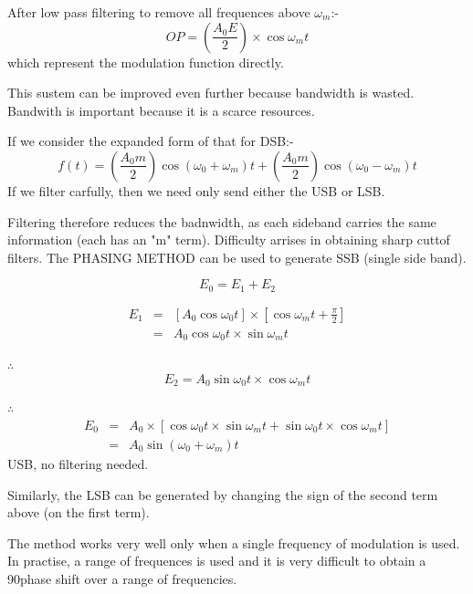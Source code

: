 \documentclass[11pt]{article} %
\begin{document}
After low pass filtering to remove all frequences above $\omega_m$:-
\begin{equation}
OP = \left(\frac{A_0 E}{2}\right) \times \cos{\omega_m t}
\end{equation}which represent the modulation function directly.

This sustem can be improved even further because bandwidth is wasted. Bandwith is important because it is a scarce resources.

If we consider the expanded form of that for DSB:-
\begin{equation}
f(t) = \left(\frac{A_0m}{2} \right) \cos{\left(\omega_0 + \omega_m\right)}t + \left(\frac{A_0m}{2} \right)  \cos{\left(\omega_0 - \omega_m\right)}t 
\end{equation}
If we filter carfully, then we need only send either the USB or LSB.


Filtering therefore reduces the badnwidth, as each sideband carries the same information (each has an "m" term). Difficulty arrises in obtaining sharp cuttof filters. The PHASING METHOD can be used to generate SSB (single side band).


\begin{equation}
E_0 = E_1+E_2
\end{equation}

\begin{eqnarray}
E_1 &=& \left[ A_0 \cos{\omega_0 t}\right] \times \left[ \cos{\omega_m t + \frac{\pi}{2}}\right]\nonumber \\
&=& A_0 \cos{\omega_0t}\times \sin{\omega_m t}
\end{eqnarray}

$\therefore$
\begin{equation}
E_2 = A_0 \sin{\omega_0t}\times \cos{\omega_m t}
\end{equation}

$\therefore$
\begin{eqnarray}
E_0 &=& A_0 \times \left[\cos{\omega_0t}\times \sin{\omega_m t}+  \sin{\omega_0t}\times \cos{\omega_m t}\right] \nonumber \\
&=& A_0 \sin{\left(\omega_0 + \omega_m\right)} t
\end{eqnarray}
USB, no filtering needed.

Similarly, the LSB can be generated by changing the sign of the second term above (on the first term).

The method works very well only when a single frequency of modulation is used. In practise, a range of frequences is used and it is very difficult to obtain a 90\textdegree phase shift over a range of frequencies.
\end{document}
